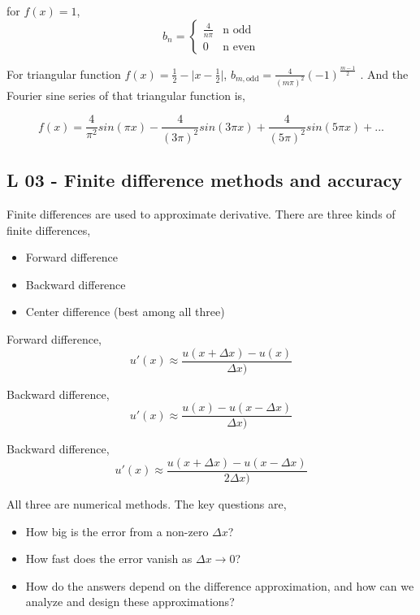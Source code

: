 \documentclass{article}
\theoremstyle{mytheoremstyle}
\theoremstyle{mytheoremstyle}
\theoremstyle{myproblemstyle}
\begin{document}
    \noindent for $ f(x) = 1 $,
    \begin{equation}
	b_n = 
    	\begin{cases}
		\frac{4}{n \pi} & \text{n odd} \\
		0 & \text{n even}
    	\end{cases}
    	\label{eq:6}
    \end{equation}

    \pagebreak

    \noindent For triangular function $ f(x) = \frac{1}{2} - \lvert x - \frac{1}{2} \rvert $, $ b_{m, \text{odd}} = \frac{4}{(m \pi)^2} (-1)^{\frac{m-1}{2}} $ . And the Fourier sine series of that triangular function is,

    \begin{equation}
	    f(x) = \frac{4}{\pi^2} sin(\pi x) - \frac{4}{(3 \pi)^2} sin(3 \pi x) + \frac{4}{(5 \pi)^2} sin(5 \pi x) + ...
    	\label{eq:7}
    \end{equation}

    \subsection{L 03 - Finite difference methods and accuracy}
    \noindent Finite differences are used to approximate derivative. There are three kinds
    of finite differences,
    \begin{itemize}
    	\item Forward difference
	\item Backward difference
	\item Center difference (best among all three)
    \end{itemize}

    \vspace{0.5cm}
    \noindent Forward difference,
    \begin{equation}
	    u'(x) \approx \frac{u(x+\Delta x) - u(x)}{\Delta x)}
    	\label{eq:8}
    \end{equation}

    \vspace{0.5cm}
    \noindent Backward difference,
    \begin{equation}
	    u'(x) \approx \frac{u(x) - u(x - \Delta x)}{\Delta x)}
    	\label{eq:9}
    \end{equation}

    \vspace{0.5cm}
    \noindent Backward difference,
    \begin{equation}
	    u'(x) \approx \frac{u(x+\Delta x) - u(x-\Delta x)}{2 \Delta x)}
    	\label{eq:10}
    \end{equation}

    \noindent All three are numerical methods. The key questions are,
    \begin{itemize}
    	\item How big is the error from a non-zero $ \Delta x $?
	\item How fast does the error vanish as $ \Delta x \to 0 $?
	\item How do the answers depend on the difference approximation, and how can we
		analyze and design these approximations?
    \end{itemize}
\end{document}
